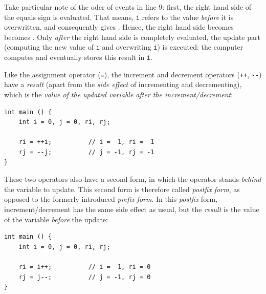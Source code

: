 {{{{\begin{center}
\begin{tabularx}
\bottomrule[1.5pt]
\end{tabularx}
\end{center}

Take particular note of the oder of events in line 9: first, the right hand side of the equals sign is evaluated. That means, \texttt{i} refers to the value \emph{before} it is overwritten, and consequently gives . Hence, the right hand side  becomes  becomes . Only \emph{after} the right hand side is completely evaluated, the update part (computing the new value of \texttt{i} and overwriting \texttt{i}) is executed: the computer computes  and eventually stores this result in \texttt{i}.

Like the assignment operator (\texttt{=}), the increment and decrement operators (\texttt{++}, \texttt{-{}-}) have a \emph{result} (apart from the \emph{side effect} of incrementing and decrementing), which is the \emph{value of the updated variable after the increment/decrement}:
\begin{codebox}[prefixShorthand.c]
\begin{verbatim}
int main () {
    int i = 0, j = 0, ri, rj;
   
    ri = ++i;          // i =  1, ri =  1
    rj = --j;          // j = -1, rj = -1
}
\end{verbatim}
\end{codebox}

These two operators also have a second form, in which the operator stands \emph{behind} the variable to update. This second form is therefore called \emph{postfix form}, as opposed to the formerly introduced \emph{prefix form}. In this \emph{postfix} form, increment/decrement has the same side effect as usual, but the \emph{result} is the value of the variable \emph{before} the update:
\begin{codebox}[postfixShorthand.c]
\begin{verbatim}
int main () {
    int i = 0, j = 0, ri, rj;
   
    ri = i++;          // i =  1, ri = 0
    rj = j--;          // j = -1, rj = 0
}
\end{verbatim}
\end{codebox}

}}}}
